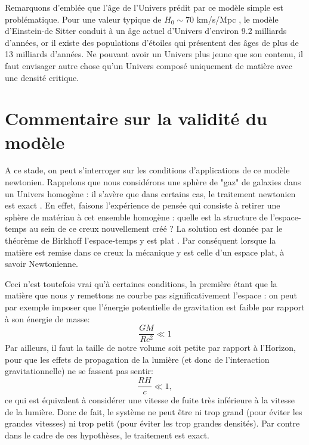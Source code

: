 Remarquons d'emblée que l'âge de l'Univers prédit par ce modèle simple est problématique. Pour une valeur typique de $H_0\sim 70$ km/s/Mpc , le modèle d'Einstein-de Sitter conduit à un âge actuel d'Univers d'environ 9.2 milliards d'années, or il existe des populations d'étoiles qui présentent des âges de plus de 13 milliards d'années. Ne pouvant avoir un Univers plus jeune que son contenu, il faut envisager autre chose qu'un Univers composé uniquement de matière avec une densité critique.

\section{Commentaire sur la validité du modèle}
A ce stade, on peut s'interroger sur les conditions d'applications de ce modèle newtonien. Rappelons que nous considérons une sphère de "gaz" de galaxies dans un Univers homogène : il s'avère que dans certains cas, le traitement newtonien est exact . En effet, faisons l'expérience de pensée qui consiste à retirer une sphère de matériau à cet ensemble homogène : quelle est la structure de l'espace-temps au sein de ce creux nouvellement créé ? La solution est donnée par le théorème de Birkhoff l'espace-temps y est plat . Par conséquent lorsque la matière est remise dans ce creux la mécanique y est celle d'un espace plat, à savoir Newtonienne.

Ceci n'est toutefois vrai qu'à certaines conditions, la première étant que la matière que nous y remettons ne courbe pas significativement l'espace : on peut par exemple imposer que l'énergie potentielle de gravitation est faible par rapport à son énergie de masse:
\begin{equation}
\frac{GM}{Rc^2}\ll 1
\end{equation}
Par ailleurs, il faut la taille de notre volume soit petite par rapport à l'Horizon, pour que les effets de propagation de la lumière (et donc de l'interaction gravitationnelle) ne se fassent pas sentir:
\begin{equation}
\frac{RH}{c}\ll 1,
\end{equation}
ce qui est équivalent à considérer une vitesse de fuite très inférieure à la vitesse de la lumière. Donc de fait, le système ne peut être ni trop grand (pour éviter les grandes vitesses) ni trop petit (pour éviter les trop grandes densités). Par contre dans le cadre de ces hypothèses, le traitement est exact.

